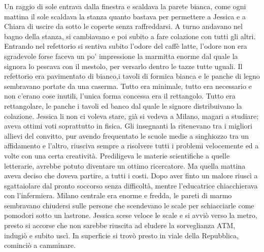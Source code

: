 Un raggio di sole entrava dalla finestra e scaldava la parete bianca, come ogni mattina il sole scaldava la stanza quanto bastava per permettere a Jessica e a Chiara di uscire da sotto le coperte senza raffreddarsi.
A turno andavano nel bagno della stanza, si cambiavano e poi subito a fare colazione con tutti gli altri. Entrando nel refettorio si sentiva subito l'odore del caffè latte, l'odore non era sgradevole forse faceva un po' impressione la marmitta enorme dal quale la signora lo pescava con il mestolo, per versarlo dentro le tazze tutte uguali.
Il refettorio era pavimentato di bianco,i tavoli di formica bianca e le panche di legno sembravano portate da una caserma. Tutto era minimale, tutto era necessario e non c'erano cose inutili, l'unica forma concessa era il rettangolo. Tutto era rettangolare, le panche i tavoli ed banco dal quale le signore distribuivano la colazione. Jessica li non ci voleva stare, già si vedeva a Milano, magari a studiare; aveva ottimi voti soprattutto in fisica. Gli insegnanti la ritenevano tra i migliori allievi del convitto, pur avendo frequentato le scuole medie a singhiozzo tra un affidamento e l'altro, riusciva sempre a risolvere tutti i problemi velocemente ed a volte con una certa creatività. Prediligeva le materie scientifiche a quelle letterarie, avrebbe potuto diventare un ottimo ricercatore. Ma quella mattina aveva deciso che doveva partire, a tutti i costi.
Dopo aver finto un malore riuscì a sgattaiolare dal pronto soccorso senza difficoltà, mentre l’educatrice chiacchierava con l’infermiera.\newline
Milano centrale era enorme e fredda, le pareti di marmo sembravano chiudersi sulle persone che scendevano le scale per schiacciarle come pomodori sotto un lastrone. Jessica scese veloce le scale e si avviò verso la metro, presto si accorse che non sarebbe riuscita ad eludere la sorveglianza ATM, indugiò e subito uscì. In superficie si trovò presto in viale della Repubblica, cominciò a camminare.

